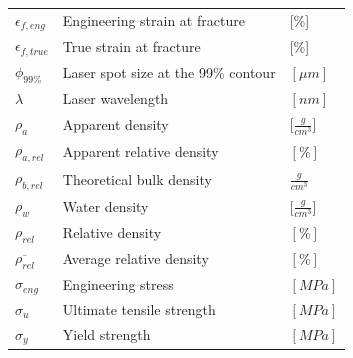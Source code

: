 \documentclass[
11pt, %
british, %
singlespacing, %
headsepline, %
]{MastersDoctoralThesis} %
\begin{document}
\begin{tabular}{lll}
$\epsilon_{f,eng}$ & Engineering strain at fracture & [\%]\\
$\epsilon_{f,true}$ & True strain at fracture & [\%]\\
$\phi_{99\%}$ & Laser spot size at the 99\% contour & $[\mu m]$\\
$\lambda$ & Laser wavelength & $[nm]$\\
$\rho_{a}$ & Apparent density & $[\frac{g}{cm^3}$] \\
$\rho_{a,rel}$ & Apparent relative density & $[\%]$ \\
$\rho_{b,rel}$ & Theoretical bulk density & $\frac{g}{cm^3}$\\ 
$\rho_{w}$ & Water density & $[\frac{g}{cm^3}$]\\
$\rho_{rel}$ & Relative density & $[\%]$ \\
$\overline{\rho_{rel}}$ & Average relative density & $[\%]$ \\
$\sigma_{eng}$ & Engineering stress & $[MPa]$\\
$\sigma_u$ & Ultimate tensile strength & $[MPa]$\\
$\sigma_y$ & Yield strength & $[MPa]$\\


\end{tabular}




\mainmatter %

\pagestyle{thesis} %



\end{document}
